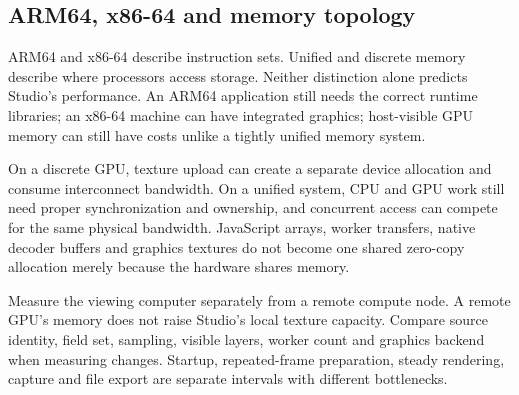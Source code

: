 \subsection{ARM64, x86-64 and memory topology}
ARM64 and x86-64 describe instruction sets. Unified and discrete memory describe
where processors access storage. Neither distinction alone predicts Studio's
performance. An ARM64 application still needs the correct runtime libraries;
an x86-64 machine can have integrated graphics; host-visible GPU memory can
still have costs unlike a tightly unified memory system.

On a discrete GPU, texture upload can create a separate device allocation and
consume interconnect bandwidth. On a unified system, CPU and GPU work still need
proper synchronization and ownership, and concurrent access can compete for the
same physical bandwidth. JavaScript arrays, worker transfers, native decoder
buffers and graphics textures do not become one shared zero-copy allocation
merely because the hardware shares memory.

Measure the viewing computer separately from a remote compute node. A remote
GPU's memory does not raise Studio's local texture capacity. Compare source
identity, field set, sampling, visible layers, worker count and graphics backend
when measuring changes. Startup, repeated-frame preparation, steady rendering,
capture and file export are separate intervals with different bottlenecks.
